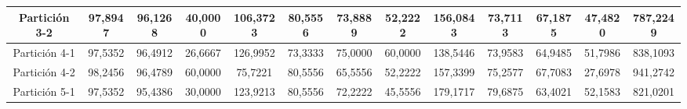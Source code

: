 \documentclass[12pt]{article}
\begin{document}
\begin{table}[H]
{\begin{tabular}{|c|cccc|cccc|cccc|}
Partición 3-2 & \multicolumn{1}{c|}{97,8947}                                                  & \multicolumn{1}{c|}{96,1268}                                                 & \multicolumn{1}{c|}{40,0000} & 106,3723 & \multicolumn{1}{c|}{80,5556}                                                  & \multicolumn{1}{c|}{73,8889}                                                 & \multicolumn{1}{c|}{52,2222} & 156,0843 & \multicolumn{1}{c|}{73,7113}                                                  & \multicolumn{1}{c|}{67,1875}                                                 & \multicolumn{1}{c|}{47,4820} & 787,2249  \\ \hline
Partición 4-1 & \multicolumn{1}{c|}{97,5352}                                                  & \multicolumn{1}{c|}{96,4912}                                                 & \multicolumn{1}{c|}{26,6667} & 126,9952 & \multicolumn{1}{c|}{73,3333}                                                  & \multicolumn{1}{c|}{75,0000}                                                 & \multicolumn{1}{c|}{60,0000} & 138,5446 & \multicolumn{1}{c|}{73,9583}                                                  & \multicolumn{1}{c|}{64,9485}                                                 & \multicolumn{1}{c|}{51,7986} & 838,1093  \\ \hline
Partición 4-2 & \multicolumn{1}{c|}{98,2456}                                                  & \multicolumn{1}{c|}{96,4789}                                                 & \multicolumn{1}{c|}{60,0000} & 75,7221  & \multicolumn{1}{c|}{80,5556}                                                  & \multicolumn{1}{c|}{65,5556}                                                 & \multicolumn{1}{c|}{52,2222} & 157,3399 & \multicolumn{1}{c|}{75,2577}                                                  & \multicolumn{1}{c|}{67,7083}                                                 & \multicolumn{1}{c|}{27,6978} & 941,2742  \\ \hline
Partición 5-1 & \multicolumn{1}{c|}{97,5352}                                                  & \multicolumn{1}{c|}{95,4386}                                                 & \multicolumn{1}{c|}{30,0000} & 123,9213 & \multicolumn{1}{c|}{80,5556}                                                  & \multicolumn{1}{c|}{72,2222}                                                 & \multicolumn{1}{c|}{45,5556} & 179,1717 & \multicolumn{1}{c|}{79,6875}                                                  & \multicolumn{1}{c|}{63,4021}                                                 & \multicolumn{1}{c|}{52,1583} & 821,0201  \\ \hline

\end{tabular}}
\end{table}
\end{document}
